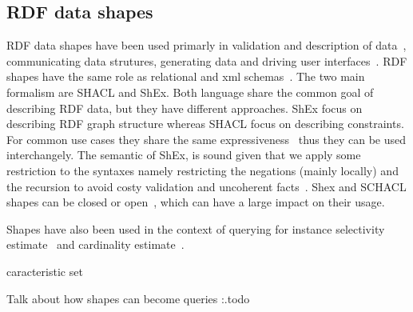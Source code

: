 \subsection{RDF data shapes}

RDF data shapes have been used primarly in validation and description of data~\cite{Gayo2018a}, communicating data strutures, generating data and driving user interfaces~\cite{Gayo2018}.
RDF shapes have the same role as relational and xml schemas~\cite{Boneva2017}.
The two main formalism are SHACL and ShEx.
Both language share the common goal of describing RDF data, but they have different approaches.
ShEx focus on describing RDF graph structure whereas SHACL focus on describing constraints.
For common use cases they share the same expressiveness~\cite{Gayo2018c} thus they can be used interchangely.
The semantic of ShEx, is sound given that we apply some restriction to the syntaxes namely restricting the negations (mainly locally) and the recursion to avoid costy validation and uncoherent facts~\cite{Boneva2017}.
Shex and SCHACL shapes can be closed or open~\cite{Gayo2018, Gayo2018b}, which can have a large impact on their usage.

Shapes have also been used in the context of querying for instance selectivity estimate~\cite{Abbas2018} and cardinality estimate~\cite{kashif2021}.

caracteristic set

Talk about how shapes can become queries
{:.todo}
\fi